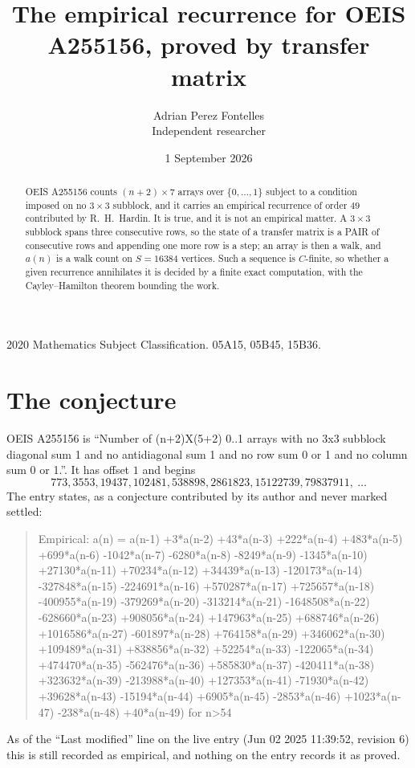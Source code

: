 \documentclass[11pt,a4paper]{article}
\title{The empirical recurrence for OEIS A255156, proved by transfer matrix}
\author{Adrian Perez Fontelles\\ \small Independent researcher}
\date{1 September 2026}
\theoremstyle{plain}
\theoremstyle{definition}
\begin{document}
\maketitle

\begin{abstract}
OEIS A255156 counts $(n+2)\times7$ arrays over $\{0,\dots,1\}$ subject to a condition imposed on
no $3\times3$ subblock, and it carries an empirical recurrence of order $49$
contributed by R.~H.~Hardin. It is true, and it is not an empirical matter. A $3\times3$
subblock spans three consecutive rows, so the state of a transfer matrix is a PAIR of
consecutive rows and appending one more row is a step; an array is then a walk, and
$a(n)$ is a walk count on $S=16384$ vertices. Such a sequence is $C$-finite, so whether a given
recurrence annihilates it is decided by a finite exact computation, with the Cayley--Hamilton
theorem bounding the work.
\end{abstract}

\noindent\small 2020 Mathematics Subject Classification. 05A15, 05B45, 15B36.\normalsize

\section{The conjecture}

OEIS A255156 is ``Number of (n+2)X(5+2) 0..1 arrays with no 3x3 subblock diagonal sum 1 and no antidiagonal sum 1 and no row sum 0 or 1 and no column sum 0 or 1.''. It has offset $1$ and begins
\[
773, 3553, 19437, 102481, 538898, 2861823, 15122739, 79837911,\ \dots
\]
The entry states, as a conjecture contributed by its author and never marked settled:
\begin{quote}
Empirical: a(n) = a(n-1) +3*a(n-2) +43*a(n-3) +222*a(n-4) +483*a(n-5) +699*a(n-6) -1042*a(n-7) -6280*a(n-8) -8249*a(n-9) -1345*a(n-10) +27130*a(n-11) +70234*a(n-12) +34439*a(n-13) -120173*a(n-14) -327848*a(n-15) -224691*a(n-16) +570287*a(n-17) +725657*a(n-18) -400955*a(n-19) -379269*a(n-20) -313214*a(n-21) -1648508*a(n-22) -628660*a(n-23) +908056*a(n-24) +147963*a(n-25) +688746*a(n-26) +1016586*a(n-27) -601897*a(n-28) +764158*a(n-29) +346062*a(n-30) +109489*a(n-31) +838856*a(n-32) +52254*a(n-33) -122065*a(n-34) +474470*a(n-35) -562476*a(n-36) +585830*a(n-37) -420411*a(n-38) +323632*a(n-39) -213988*a(n-40) +127353*a(n-41) -71930*a(n-42) +39628*a(n-43) -15194*a(n-44) +6905*a(n-45) -2853*a(n-46) +1023*a(n-47) -238*a(n-48) +40*a(n-49) for n>54
\end{quote}
As of the ``Last modified'' line on the live entry (Jun 02 2025 11:39:52, revision 6) this is still
recorded as empirical, and nothing on the entry records it as proved.
\end{document}
